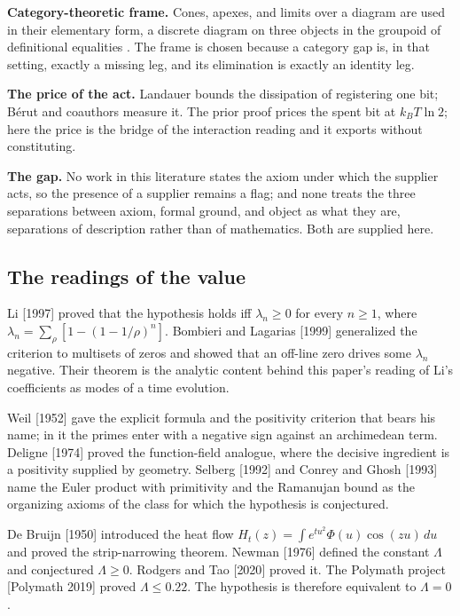 \documentclass[10pt]{article}
\begin{document}
\textbf{Category-theoretic frame.} Cones, apexes, and limits over a
diagram are used in their elementary form, a discrete diagram on three
objects in the groupoid of definitional equalities \cite{maclane1998}.
The frame is chosen because a category gap is, in that setting, exactly
a missing leg, and its elimination is exactly an identity leg.

\textbf{The price of the act.} Landauer \cite{landauer1961} bounds the
dissipation of registering one bit; Bérut and coauthors \cite{berut2012}
measure it. The prior proof prices the spent bit at \(k_B T \ln 2\);
here the price is the bridge of the interaction reading and it exports
without constituting.

\textbf{The gap.} No work in this literature states the axiom under
which the supplier acts, so the presence of a supplier remains a flag;
and none treats the three separations between axiom, formal ground, and
object as what they are, separations of description rather than of
mathematics. Both are supplied here.

\hypertarget{the-readings-of-the-value}{%
\subsection{The readings of the value}\label{the-readings-of-the-value}}

Li {[}1997{]} proved that the hypothesis holds iff \(\lambda_n \geq 0\)
for every \(n \geq 1\), where
\(\lambda_n = \sum_\rho [1 - (1 - 1/\rho)^n]\). Bombieri and Lagarias
{[}1999{]} generalized the criterion to multisets of zeros and showed
that an off-line zero drives some \(\lambda_n\) negative. Their theorem
is the analytic content behind this paper's reading of Li's coefficients
as modes of a time evolution.

Weil {[}1952{]} gave the explicit formula and the positivity criterion
that bears his name; in it the primes enter with a negative sign against
an archimedean term. Deligne {[}1974{]} proved the function-field
analogue, where the decisive ingredient is a positivity supplied by
geometry. Selberg {[}1992{]} and Conrey and Ghosh {[}1993{]} name the
Euler product with primitivity and the Ramanujan bound as the organizing
axioms of the class for which the hypothesis is conjectured.

De Bruijn {[}1950{]} introduced the heat flow
\(H_t(z) = \int e^{tu^2} \Phi(u) \cos(zu)\, du\) and proved the
strip-narrowing theorem. Newman {[}1976{]} defined the constant
\(\Lambda\) and conjectured \(\Lambda \geq 0\). Rodgers and Tao
{[}2020{]} proved it. The Polymath project {[}Polymath 2019{]} proved
\(\Lambda \leq 0.22\). The hypothesis is therefore equivalent to
\(\Lambda = 0\).
\end{document}

